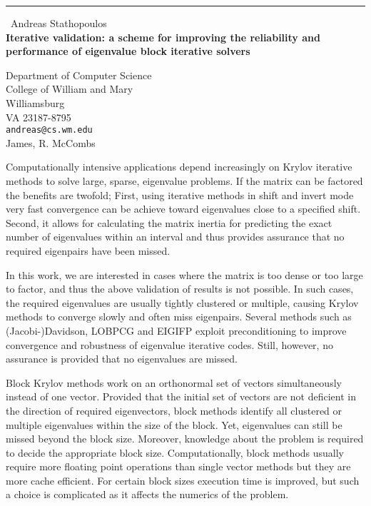 \documentclass{report}
\begin{document}
\begin{center}
\rule{6in}{1pt} \
{\large Andreas Stathopoulos \\
{\bf Iterative validation: a scheme for improving the reliability and performance of eigenvalue block iterative solvers}}

Department of Computer Science  \\           College of William and Mary \\ Williamsburg \\ VA 23187-8795
\\
{\tt andreas@cs.wm.edu}\\
James, R. McCombs\end{center}

Computationally intensive applications depend increasingly on
Krylov iterative methods to solve large, sparse,
eigenvalue problems.
If the matrix can be factored the benefits are twofold;
First, using iterative methods in shift and invert mode very fast
convergence can be achieve toward eigenvalues close to a specified shift.
Second, it allows for calculating the matrix inertia
for predicting the exact number of eigenvalues within an interval
and thus provides assurance that no required eigenpairs have been missed.

In this work, we are interested in cases where the matrix is too dense
or too large to factor, and thus the above validation of results is
not possible.
In such cases, the required eigenvalues are usually
tightly clustered or multiple, causing Krylov methods to converge
slowly and often miss eigenpairs.
Several methods such as (Jacobi-)Davidson, LOBPCG and EIGIFP
exploit preconditioning to improve convergence and robustness of
eigenvalue iterative codes.
Still, however, no assurance is provided that no eigenvalues are missed.

Block Krylov methods work on an orthonormal set of vectors simultaneously
instead of one vector.
Provided that the initial set of vectors are not deficient in the direction
of required eigenvectors, block methods identify all clustered or
multiple eigenvalues within the size of the block.
Yet, eigenvalues can still be missed beyond the block size.
Moreover, knowledge about the problem is required to decide the
appropriate block size.
Computationally, block methods usually require more floating point
operations than single vector methods but they are more cache efficient.
For certain block sizes execution time is improved, but such
a choice is complicated as it affects the numerics of the problem.
\end{document}
